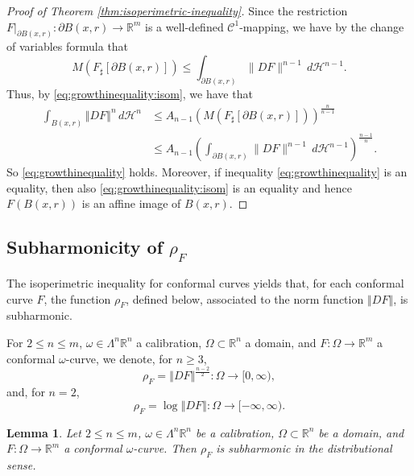 \documentclass[a4paper,leqno,11pt]{amsart}
\numberwithin{equation}{section}
\newtheorem{lemma}[theorem]{Lemma}
\theoremstyle{remark}
\theoremstyle{remark}
\newcommand{\R}{\mathbb{R}}
\newcommand{\norm}[1]{ \left\Vert #1 \right\Vert }	%
\begin{document}
\begin{proof}[Proof of Theorem \ref{thm:isoperimetric-inequality}]
Since the restriction $F|_{ \partial B(x,r) } \colon \partial B(x,r) \rightarrow \mathbb{R}^m$ is a well-defined $\mathcal{C}^1$-mapping, we have by the change of variables formula that
\[
M( F_\sharp[ \partial B(x,r) ] ) \leq \int_{ \partial B(x,r) } \|DF\|^{n-1} \,d\mathcal{H}^{n-1}.
\]
Thus, by \eqref{eq:growthinequality:isom}, we have that
\begin{align*}
\int_{B(x,r)} \norm{DF}^n \, d\mathcal{H}^n 
&\leq A_{n-1} \left( M( F_\sharp[ \partial B(x,r) ] ) \right)^{ \frac{n}{n-1} } \\
&\le A_{n-1} \left( \int_{ \partial B(x,r) } \|DF\|^{n-1} \,d\mathcal{H}^{n-1} \right)^{\frac{n-1}{n}}.
\end{align*}
So \eqref{eq:growthinequality} holds. Moreover, if inequality \eqref{eq:growthinequality} is an equality, then also \eqref{eq:growthinequality:isom} is an equality and hence $F( B(x,r) )$ is an affine image of $B(x,r)$.
\end{proof}



\subsection{Subharmonicity of $\rho_F$}

The isoperimetric inequality for conformal curves yields that, for each conformal curve $F$, the function $\rho_F$, defined below, associated to the norm function $\norm{DF}$, is subharmonic.

For $2\le n \le m$, $\omega \in \Lambda^n \R^n$ a calibration, $\Omega \subset \R^n$ a domain, and $F\colon \Omega \to \R^m$ a conformal $\omega$-curve, we denote, for $n\ge 3$, 
\[
\rho_F = \norm{DF}^{\frac{n-2}{2}} \colon \Omega \to [0,\infty),
\]
and, for $n=2$, 
\[
\rho_F = \log \norm{DF} \colon \Omega \to [-\infty,\infty).
\]


\begin{lemma}
\label{lemma:subharmonicity}
Let $2\le n \le m$, $\omega \in \Lambda^n \R^n$ be a calibration, $\Omega \subset \R^n$ be a domain, and $F \colon \Omega \to \R^m$ a conformal $\omega$-curve. Then $\rho_F$ is subharmonic in the distributional sense.
\end{lemma}

\end{document}
